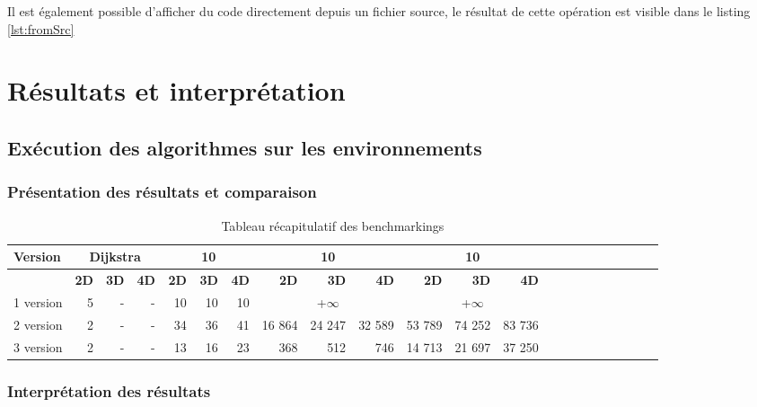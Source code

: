 \documentclass[pidr]{tnreport}
\begin{document}
Il est également possible d'afficher du code directement depuis un fichier source, le résultat de cette opération est visible dans le listing \ref{lst:fromSrc}


\chapter{Résultats et interprétation}
	
	\section{Exécution des algorithmes sur les environnements}
		
		\subsection{Présentation des résultats et comparaison}
		
\begin{table}[h]
\begin{center}
   \begin{tabular}{| l | r | r | r | r | r | r | r | r | r | r | r | r | r | r | r | r | r | r | r | r | r |}
     \hline
      \textbf{Version} & \multicolumn{3}{c|}{\textbf{Dijkstra}} & \multicolumn{3}{c|}{\textbf{10\up{4}}} & \multicolumn{3}{c|}{\textbf{10\up{6}}} & \multicolumn{3}{c|}{\textbf{10\up{7}}} \\
     \hline
     \cline{2-5}
    & \textbf{2D} & \textbf{3D} & \textbf{4D} & \textbf{2D} & \textbf{3D} & \textbf{4D} & \textbf{2D} & \textbf{3D} & \textbf{4D} & \textbf{2D} & \textbf{3D} & \textbf{4D}\\ \hline
     1\up{ère} version & 5 & - & - & ~10\up{7} & ~10\up{8} & ~10\up{8} & \multicolumn{3}{c|}{+$\infty$}  & \multicolumn{3}{c|}{+$\infty$}   \\ \hline
     2\up{ème} version & 2 & - & - & 34 & 36 & 41 & 16 864 & 24 247 & 32 589 & 53 789 & 74 252 & 83 736  \\ \hline
     3\up{ème} version & 2 & - & - & 13 & 16 & 23 & 368 & 512 & 746  & 14 713 & 21 697 & 37 250 \\ \hline
   \end{tabular}
 \end{center}
 \caption{Tableau récapitulatif des benchmarkings}
\end{table}		
		
		\subsection{Interprétation des résultats}
\end{document}
